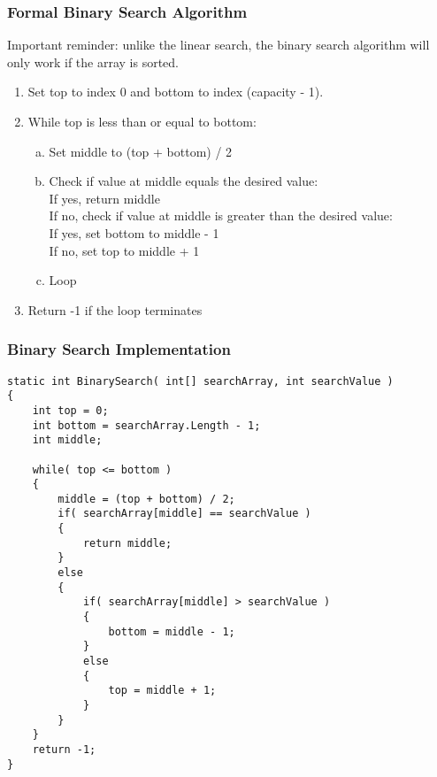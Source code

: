 \begin{frame}
\frametitle{Formal Binary Search Algorithm}

Important reminder: unlike the linear search, the binary search algorithm will only work if the array is sorted.

\begin{enumerate}
\item Set top to index 0 and bottom to index (capacity - 1).
\item While top is less than or equal to bottom:
	\begin{enumerate}[a)]
		\item Set middle to (top + bottom) / 2
		\item Check if value at middle equals the desired value:\\
			  \quad If yes, return middle\\
			  \quad If no, check if value at middle is greater than the desired value:\\
				\quad\quad If yes, set bottom to middle - 1\\
				\quad\quad If no, set top to middle + 1
		\item Loop
	\end{enumerate}
\item Return -1 if the loop terminates
\end{enumerate}

\end{frame}

\begin{frame}[fragile]
\frametitle{Binary Search Implementation}
{\tiny
\begin{verbatim}
static int BinarySearch( int[] searchArray, int searchValue )
{
    int top = 0; 
    int bottom = searchArray.Length - 1;
    int middle;

    while( top <= bottom )
    {
        middle = (top + bottom) / 2;
        if( searchArray[middle] == searchValue )
        {
            return middle;
        }
        else
        {
            if( searchArray[middle] > searchValue )
            {
                bottom = middle - 1;
            }
            else
            {
                top = middle + 1;
            }
        }
    }
    return -1;
}
\end{verbatim}
}
\end{frame}


